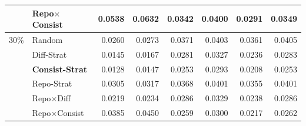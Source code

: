\begin{table}[t]
\begin{tabular}{llrrrrrr}
 & Repo$\times$Consist & 0.0538 & 0.0632 & 0.0342 & 0.0400 & 0.0291 & 0.0349 \\
\midrule
30\% & Random & 0.0260 & 0.0273 & 0.0371 & 0.0403 & 0.0361 & 0.0405 \\
 & Diff-Strat & 0.0145 & 0.0167 & 0.0281 & 0.0327 & 0.0236 & 0.0283 \\
 & \textbf{Consist-Strat} & 0.0128 & 0.0147 & 0.0253 & 0.0293 & 0.0208 & 0.0253 \\
 & Repo-Strat & 0.0305 & 0.0317 & 0.0368 & 0.0401 & 0.0355 & 0.0401 \\
 & Repo$\times$Diff & 0.0219 & 0.0234 & 0.0286 & 0.0329 & 0.0238 & 0.0286 \\
 & Repo$\times$Consist & 0.0385 & 0.0450 & 0.0259 & 0.0300 & 0.0217 & 0.0262 \\
\bottomrule
\end{tabular}
\end{table}
